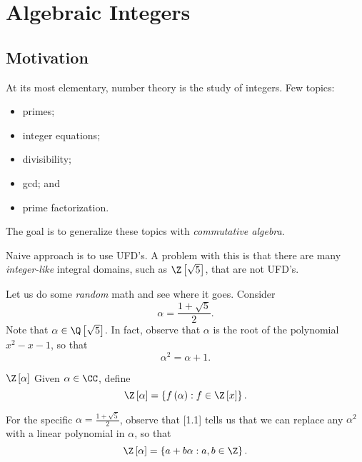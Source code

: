 \documentclass[pmath441]{subfiles}
\begin{document}
    \section{Algebraic Integers}
    
    \subsection{Motivation}
    
    At its most elementary, number theory is the study of integers. Few topics:
    \begin{itemize}
        \item primes;
        \item integer equations;
        \item divisibility;
        \item gcd; and
        \item prime factorization.
    \end{itemize} 
    The goal is to generalize these topics with \textit{commutative algebra}.

    Naive approach is to use UFD's. A problem with this is that there are many \textit{integer-like} integral domains, such as $\Z\left[ \sqrt{5} \right]$, that are not UFD's.

    Let us do some \textit{random} math and see where it goes. Consider
    \begin{equation*}
        \alpha = \frac{1+\sqrt{5}}{2}.
    \end{equation*}
    Note that $\alpha\in\Q\left[ \sqrt{5} \right]$. In fact, observe that $\alpha$ is the root of the polynomial $x^{2}-x-1$, so that
    \begin{equation}
        \alpha^{2} = \alpha + 1.
    \end{equation}
    
    \begin{definition}{$\Z\left[ \alpha \right]$}
        Given $\alpha\in\CC$, define
        \begin{equation*}
            \Z\left[ \alpha \right] = \left\lbrace f\left( \alpha \right): f\in\Z\left[ x \right] \right\rbrace.
        \end{equation*}
    \end{definition}

    For the specific $\alpha = \frac{1+\sqrt{5}}{2}$, observe that [1.1] tells us that we can replace any $\alpha^{2}$ with a linear polynomial in $\alpha$, so that
    \begin{equation*}
        \Z\left[ \alpha \right] = \left\lbrace a+b\alpha : a,b\in\Z \right\rbrace.
    \end{equation*}
\end{document}
